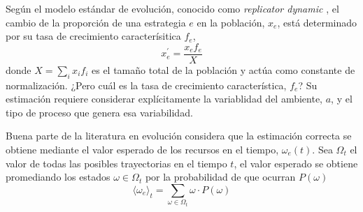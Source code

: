 \documentclass[a4paper,10pt]{article}
\begin{document}

Según el modelo estándar de evolución, conocido como \emph{replicator dynamic} \cite{taylor1978-replicatorDynamic, schuster1983-replicatorDynamics, hofbauer2003-evolutionaryGameDynamics}, el cambio de la proporción de una estrategia $e$ en la población, $x_e$, está determinado por su tasa de crecimiento caracterísitica $f_e$,
\begin{equation} \label{eq:replicator_dynamic}  \tag{Replicator dynamic}
x_e^\prime = \frac{x_e f_e}{X}
\end{equation}
donde $X=\sum_i x_i f_i$ es el tamaño total de la población y actúa como constante de normalización.
¿Pero cuál es la tasa de crecimiento característica, $f_e$?
Su estimación requiere considerar explícitamente la variablidad del ambiente, $a$, y el tipo de proceso que genera esa variabilidad.


Buena parte de la literatura en evolución considera que la estimación correcta se obtiene mediante el valor esperado de los recursos en el tiempo, $\omega_e(t)$.
Sea $\Omega_t$ el valor de todas las posibles trayectorias en el tiempo $t$, el valor esperado se obtiene promediando los estados $\omega \in \Omega_t$ por la probabilidad de que ocurran $P(\omega)$
\begin{equation}
\langle \omega_e \rangle_t = \sum_{\omega \in \Omega_t} \omega \cdot  P(\omega)
\end{equation}

\end{document}
